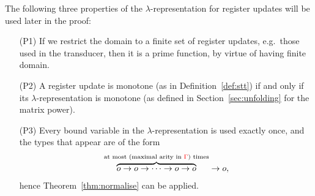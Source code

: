 The following  three properties of the $\lambda$-representation for register updates will be used later in the proof:
\begin{enumerate}
\item[(P1)]  If we restrict the domain to a finite set of register updates, e.g.~those used in the transducer, then it is a prime function, by virtue of having finite domain.
\item[(P2)] A register update is monotone  (as in Definition~\ref{def:stt})  if and only if its $\lambda$-representation is monotone (as defined in    Section~\ref{sec:unfolding} for the matrix power).
\item[(P3)] Every bound variable in the $\lambda$-representation is used exactly once, and the types that appear are of the form 
\begin{align*}
\overbrace{o \to o \to \cdots \to o \to o}^{\text{at most (maximal arity in ${\color{red}{\Gamma}}$) times}} \to o,
\end{align*}
hence Theorem~\ref{thm:normalise} can be applied. 
\end{enumerate}

 
%
    
